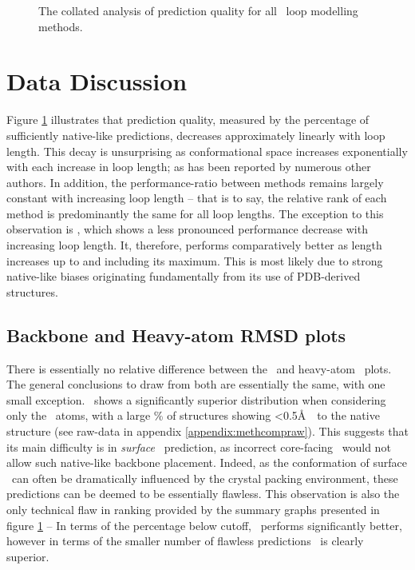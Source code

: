 \begin{figure}[hptb]
\begin{center}
  \end{center}
  \caption{The collated analysis of prediction quality for all \abinitio\ loop modelling  methods.}
\label{fig:methcomp:summary_graph}
\end{figure}



\section{Data Discussion}

Figure \ref{fig:methcomp:summary_graph} illustrates that prediction quality, measured by the percentage of sufficiently native-like predictions, decreases approximately linearly with loop length. This decay is unsurprising as conformational space increases exponentially with each increase in loop length; as has been reported by numerous other authors. In addition, the performance-ratio between methods remains largely constant with increasing loop length -- that is to say, the relative rank of each method is predominantly the same for all loop lengths. The exception to this observation is \coda, which shows a less pronounced performance decrease with increasing loop length. It, therefore, performs comparatively better as length increases up to and including its   maximum.
This is most likely due to strong native-like biases originating fundamentally from its use of PDB-derived structures.






\subsection{Backbone and Heavy-atom RMSD plots}

There is essentially no relative difference between the \mainchain\ and heavy-atom \crms\ plots.
The general conclusions to draw from both are essentially the same, with one small exception.
\plop\ shows a significantly superior distribution when considering only the \mainchain\ atoms, with a large \% of structures showing \textless0.5\AA\ \crms\ to the native structure (see raw-data in appendix \ref{appendix:methcompraw}). This suggests that its main difficulty is in \emph{surface} \sidechain\ prediction, as incorrect core-facing \sidechains\ would not allow such native-like backbone placement.
Indeed, as the conformation of surface \sidechains\ can often be dramatically influenced by the crystal packing environment, these predictions can be deemed to be essentially flawless. This observation is also the only technical flaw in ranking provided by the summary graphs presented in figure \ref{fig:methcomp:summary_graph}  --   In terms of the percentage
below cutoff, \modloop\ performs significantly better, however in terms of the smaller number of flawless predictions \plop\ is clearly superior.



